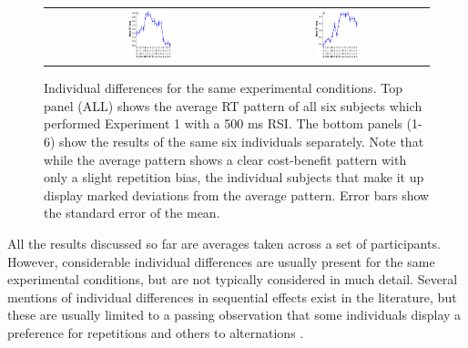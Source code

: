 \documentclass{apa}[12pt]
\begin{document}
\begin{figure}
\begin{tabular}{ccc}
   & \includegraphics[width=0.25\textwidth]{subject5_500ms.pdf}\label{individual5}
   & \includegraphics[width=0.25\textwidth]{subject6_500ms.pdf}\label{individual6}\\
\end{tabular}
\caption[Individual differences for the same experimental conditions]{Individual differences for the same experimental conditions. Top panel (ALL) shows the average RT pattern of all six subjects which performed Experiment 1 with a 500 ms RSI. The bottom panels (1-6) show the results of the same six individuals separately. Note that while the average pattern shows a clear cost-benefit pattern with only a slight repetition bias, the individual subjects that make it up display marked deviations from the average pattern. Error bars show the standard error of the mean.}\label{individual_subjects}
\end{figure}

All the results discussed so far are averages taken across a set of participants. However, considerable individual differences are usually present for the same experimental conditions, but are not typically considered in much detail. Several mentions of individual differences in sequential effects exist in the literature, but these are usually limited to a passing observation that some individuals display a preference for repetitions and others to alternations \cite{Arons32,Bertelson65,Kornblum69,Kirby76}.
\end{document}

